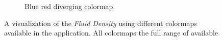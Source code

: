 \begin{figure}
\begin{subfigure}{0.44\textwidth}
		\caption{Blue red diverging colormap.}
		\label{fig:colormapping:intro:differntColorMaps:diverging}
	\end{subfigure}				

	\caption{A visualization of the \emph{Fluid Density} using different colormaps available in the application. All colormaps the full range of available}
	\label{fig:colormapping:colormaps}
\end{figure}